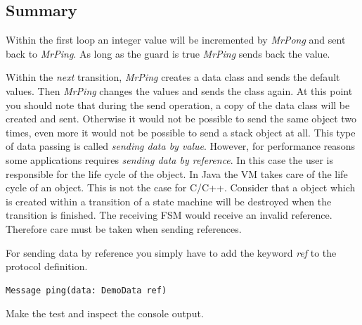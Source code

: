 \subsection{Summary}

Within the first loop an integer value will be incremented by \textit{MrPong} and sent back to 
\textit{MrPing}. As long as the guard is true \textit{MrPing} sends back the value.

Within the \textit{next} transition, \textit{MrPing} creates a data class and sends the default values. 
Then \textit{MrPing} changes the values and sends the class again. At this point you should note that 
during the send operation, a copy of the data class will be created and sent. Otherwise it would not be 
possible to send the same object two times, even more it would not be possible to send a stack object at 
all. This type of data passing is called \textit{sending data by value}.
However, for performance reasons some applications requires \textit{sending data by reference}. In this 
case the user is responsible for the life cycle of the object. In Java the VM takes care of the life cycle 
of an object. This is not the case for C/C++. Consider that a object which is created within a transition 
of a state machine will be destroyed when the transition is finished. The receiving FSM would receive an 
invalid reference. Therefore care must be taken when sending references.      

For sending data by reference you simply have to add the keyword \textit{ref} to the protocol definition.
 
\begin{verbatim}Message ping(data: DemoData ref)\end{verbatim}

Make the test and inspect the console output.
